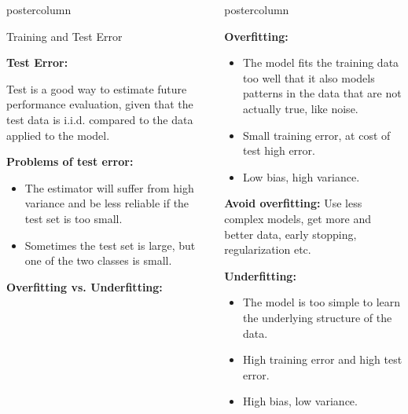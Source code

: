 \documentclass{beamer}
\newlength{\columnheight} %
\begin{document}
\begin{frame}[fragile]{}
\begin{columns}
\begin{column}{.31\textwidth}
\begin{beamercolorbox}[center]{postercolumn}
\begin{minipage}{.98\textwidth}
{\begin{myblock}{Training and Test Error}
        \begin{codebox}
          \textbf{Test Error: }
          \end{codebox}
          Test is a good way to estimate future performance evaluation, given that the test data is i.i.d. compared to the data applied to the model.
          
          \textbf{Problems of test error:}
          \begin{itemize}[$\bullet$]
          \setlength{\itemindent}{+.3in}
          \item The estimator will suffer from high variance and be less reliable if the test set is too small.
          \item Sometimes the test set is large, but one of the two classes is small.
          \end{itemize}
          
          \begin{codebox}
            \textbf{Overfitting vs. Underfitting: }
            \end{codebox}

      \end{myblock}
				}
			\end{minipage}
		\end{beamercolorbox}
	\end{column}
	
	
	\begin{column}{.31\textwidth}
  \begin{beamercolorbox}[center]{postercolumn}
  \begin{minipage}{.98\textwidth}
  \parbox[t][\columnheight]{\textwidth}{

    \begin{myblock}{ }

      \textbf{Overfitting:}
      \begin{itemize}[$\bullet$]
        \setlength{\itemindent}{+.3in}
        \item The model fits the training data too well that it also models patterns in the data that are not actually true, like noise.
        \item Small training error, at cost of test high error.
       \item Low bias, high variance.
       \end{itemize}
       \textbf{Avoid overfitting:} Use less complex models, get more and better data, early stopping, regularization etc.
 
       \textbf{Underfitting:} 
       \begin{itemize}[$\bullet$]
         \setlength{\itemindent}{+.3in}
         \item The model is too simple to learn the underlying structure of the data.
         \item High training error and high test error.
        \item High bias, low variance.
        \end{itemize}


\end{myblock}}
\end{minipage}
\end{beamercolorbox}
\end{column}
\end{columns}
\end{frame}
\end{document}
